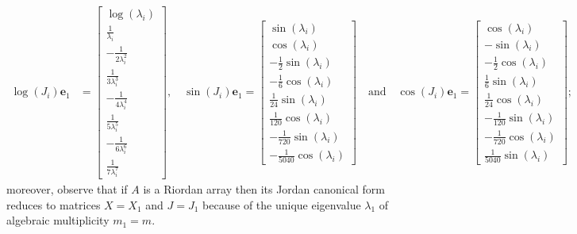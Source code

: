 \begin{displaymath}
\begin{split}
\log{\left (J_{i} \right )} \boldsymbol{e}_{1} &= \left[\begin{matrix}\log{\left (\lambda_{i} \right )}\\\frac{1}{\lambda_{i}}\\- \frac{1}{2 \lambda_{i}^{2}}\\\frac{1}{3 \lambda_{i}^{3}}\\- \frac{1}{4 \lambda_{i}^{4}}\\\frac{1}{5 \lambda_{i}^{5}}\\- \frac{1}{6 \lambda_{i}^{6}}\\\frac{1}{7 \lambda_{i}^{7}}\end{matrix}\right], \quad
\sin{\left (J_{i} \right )} \boldsymbol{e}_{1} = \left[\begin{matrix}\sin{\left (\lambda_{i} \right )}\\\cos{\left (\lambda_{i} \right )}\\- \frac{1}{2} \sin{\left (\lambda_{i} \right )}\\- \frac{1}{6} \cos{\left (\lambda_{i} \right )}\\\frac{1}{24} \sin{\left (\lambda_{i} \right )}\\\frac{1}{120} \cos{\left (\lambda_{i} \right )}\\- \frac{1}{720} \sin{\left (\lambda_{i} \right )}\\- \frac{1}{5040} \cos{\left (\lambda_{i} \right )}\end{matrix}\right]
\quad\text{and}\quad
\cos{\left (J_{i} \right )} \boldsymbol{e}_{1} = \left[\begin{matrix}\cos{\left (\lambda_{i} \right )}\\- \sin{\left (\lambda_{i} \right )}\\- \frac{1}{2} \cos{\left (\lambda_{i} \right )}\\\frac{1}{6} \sin{\left (\lambda_{i} \right )}\\\frac{1}{24} \cos{\left (\lambda_{i} \right )}\\- \frac{1}{120} \sin{\left (\lambda_{i} \right )}\\- \frac{1}{720} \cos{\left (\lambda_{i} \right )}\\\frac{1}{5040} \sin{\left (\lambda_{i} \right )}\end{matrix}\right]; \quad
\end{split}
\end{displaymath}
moreover, observe that if $A$ is a Riordan array then its Jordan canonical form
reduces to matrices $X = X_{1}$ and $J = J_{1}$ because of the unique
eigenvalue $\lambda_{1}$ of algebraic multiplicity $m_{1} = m$.

